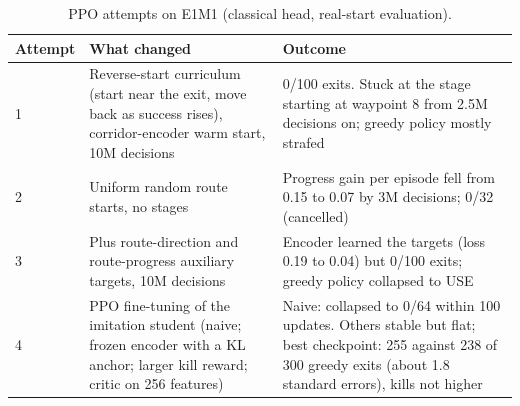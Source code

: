 \documentclass[10pt, a4paper]{article}
\begin{document}
\begin{table}[htbp]
\centering
\footnotesize
\renewcommand{\arraystretch}{1.1}
\caption{PPO attempts on E1M1 (classical head, real-start evaluation).}
\label{tab:ppo}
\begin{tabularx}{\textwidth}{lXX}
\toprule
\textbf{Attempt} & \textbf{What changed} & \textbf{Outcome} \\
\midrule
1 & Reverse-start curriculum (start near the exit, move back as success rises), corridor-encoder warm start, 10M decisions & 0/100 exits. Stuck at the stage starting at waypoint 8 from 2.5M decisions on; greedy policy mostly strafed \\
2 & Uniform random route starts, no stages & Progress gain per episode fell from 0.15 to 0.07 by 3M decisions; 0/32 (cancelled) \\
3 & Plus route-direction and route-progress auxiliary targets, 10M decisions & Encoder learned the targets (loss 0.19 to 0.04) but 0/100 exits; greedy policy collapsed to USE \\
4 & PPO fine-tuning of the imitation student (naive; frozen encoder with a KL anchor; larger kill reward; critic on 256 features) & Naive: collapsed to 0/64 within 100 updates. Others stable but flat; best checkpoint: 255 against 238 of 300 greedy exits (about 1.8 standard errors), kills not higher \\
\bottomrule
\end{tabularx}
\end{table}
\end{document}
